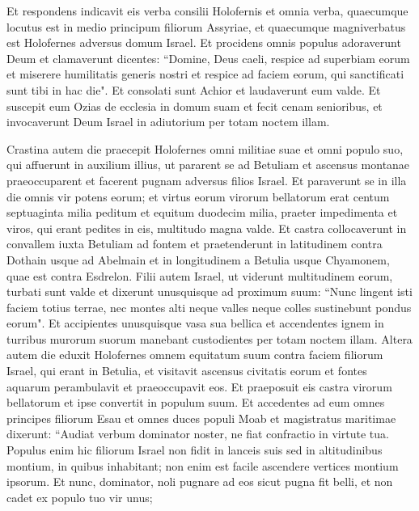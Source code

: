 \begin{biblechapter}
\verse Et respondens indicavit eis verba consilii Holofernis et omnia verba, quaecumque locutus est in medio principum filiorum Assyriae, et quaecumque magniverbatus est Holofernes adversus domum Israel.  
\verse Et procidens omnis populus adoraverunt Deum et clamaverunt dicentes: 
\verse “Domine, Deus caeli, respice ad superbiam eorum et miserere humilitatis generis nostri et respice ad faciem eorum, qui sanctificati sunt tibi in hac die".  
\verse Et consolati sunt Achior et laudaverunt eum valde. 
\verse Et suscepit eum Ozias de ecclesia in domum suam et fecit cenam senioribus, et invocaverunt Deum Israel in adiutorium per totam noctem illam. 
\end{biblechapter}

\begin{biblechapter}   
\verse Crastina autem die praecepit Holofernes omni militiae suae et omni populo suo, qui affuerunt in auxilium illius, ut pararent se ad Betuliam et ascensus montanae praeoccuparent et facerent pugnam adversus filios Israel. 
\verse Et paraverunt se in illa die omnis vir potens eorum; et virtus eorum virorum bellatorum erat centum septuaginta milia peditum et equitum duodecim milia, praeter impedimenta et viros, qui erant pedites in eis, multitudo magna valde.  
\verse Et castra collocaverunt in convallem iuxta Betuliam ad fontem et praetenderunt in latitudinem contra Dothain usque ad Abelmain et in longitudinem a Betulia usque Chyamonem, quae est contra Esdrelon. 
\verse Filii autem Israel, ut viderunt multitudinem eorum, turbati sunt valde et dixerunt unusquisque ad proximum suum: “Nunc lingent isti faciem totius terrae, nec montes alti neque valles neque colles sustinebunt pondus eorum". 
\verse Et accipientes unusquisque vasa sua bellica et accendentes ignem in turribus murorum suorum manebant custodientes per totam noctem illam. 
\verse Altera autem die eduxit Holofernes omnem equitatum suum contra faciem filiorum Israel, qui erant in Betulia, 
\verse et visitavit ascensus civitatis eorum et fontes aquarum perambulavit et praeoccupavit eos. Et praeposuit eis castra virorum bellatorum et ipse convertit in populum suum. 
\verse Et accedentes ad eum omnes principes filiorum Esau et omnes duces populi Moab et magistratus maritimae dixerunt: 
\verse “Audiat verbum dominator noster, ne fiat confractio in virtute tua. 
\verse Populus enim hic filiorum Israel non fidit in lanceis suis sed in altitudinibus montium, in quibus inhabitant; non enim est facile ascendere vertices montium ipsorum. 
\verse Et nunc, dominator, noli pugnare ad eos sicut pugna fit belli, et non cadet ex populo tuo vir unus; 

\end{biblechapter}
